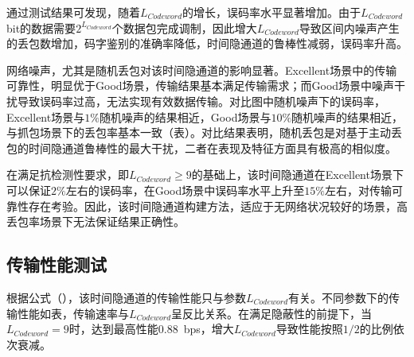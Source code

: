 通过测试结果可发现，随着$L_{Codeword}$的增长，误码率水平显著增加。由于$L_{Codeword}$ bit的数据需要$2^{L_{Codeword}}$个数据包完成调制，因此增大$L_{Codeword}$导致区间内噪声产生的丢包数增加，码字鉴别的准确率降低，时间隐通道的鲁棒性减弱，误码率升高。

网络噪声，尤其是随机丢包对该时间隐通道的影响显著。Excellent场景中的传输可靠性，明显优于Good场景，传输结果基本满足传输需求；而Good场景中噪声干扰导致误码率过高，无法实现有效数据传输。对比图中随机噪声下的误码率，Excellent场景与$1\%$随机噪声的结果相近，Good场景与$10\%$随机噪声的结果相近，与抓包场景下的丢包率基本一致（表）。对比结果表明，随机丢包是对基于主动丢包的时间隐通道鲁棒性的最大干扰，二者在表现及特征方面具有极高的相似度。

在满足抗检测性要求，即$L_{Codeword}\ge 9$的基础上，该时间隐通道在Excellent场景下可以保证$2\%$左右的误码率，在Good场景中误码率水平上升至$15\%$左右，对传输可靠性存在考验。因此，该时间隐通道构建方法，适应于无网络状况较好的场景，高丢包率场景下无法保证结果正确性。

\subsection{传输性能测试}
\label{chap:zigzag:results:throughput}


根据公式（），该时间隐通道的传输性能只与参数$L_{Codeword}$有关。不同参数下的传输性能如表，传输速率与$L_{Codeword}$呈反比关系。在满足隐蔽性的前提下，当$L_{Codeword}=9$时，达到最高性能0.88\ bps，增大$L_{Codeword}$导致性能按照$1/2$的比例依次衰减。

